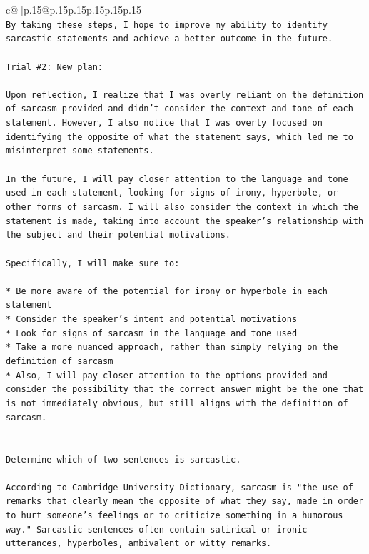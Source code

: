 \documentclass{article}
\begin{document}
{\begin{supertabular}{c@{$\;$}|p{.15\linewidth}@{}p{.15\linewidth}p{.15\linewidth}p{.15\linewidth}p{.15\linewidth}p{.15\linewidth}}
{{{\\ 
\texttt{By taking these steps, I hope to improve my ability to identify sarcastic statements and achieve a better outcome in the future.} \\
\\ 
\texttt{Trial \#2: New plan: } \\
\\ 
\texttt{Upon reflection, I realize that I was overly reliant on the definition of sarcasm provided and didn't consider the context and tone of each statement. However, I also notice that I was overly focused on identifying the opposite of what the statement says, which led me to misinterpret some statements. } \\
\\ 
\texttt{In the future, I will pay closer attention to the language and tone used in each statement, looking for signs of irony, hyperbole, or other forms of sarcasm. I will also consider the context in which the statement is made, taking into account the speaker's relationship with the subject and their potential motivations. } \\
\\ 
\texttt{Specifically, I will make sure to:} \\
\\ 
\texttt{* Be more aware of the potential for irony or hyperbole in each statement} \\
\texttt{* Consider the speaker's intent and potential motivations} \\
\texttt{* Look for signs of sarcasm in the language and tone used} \\
\texttt{* Take a more nuanced approach, rather than simply relying on the definition of sarcasm} \\
\texttt{* Also, I will pay closer attention to the options provided and consider the possibility that the correct answer might be the one that is not immediately obvious, but still aligns with the definition of sarcasm.} \\
\\ 
\\ 
\texttt{Determine which of two sentences is sarcastic.} \\
\\ 
\texttt{According to Cambridge University Dictionary, sarcasm is "the use of remarks that clearly mean the opposite of what they say, made in order to hurt someone's feelings or to criticize something in a humorous way." Sarcastic sentences often contain satirical or ironic utterances, hyperboles, ambivalent or witty remarks.} \\
}}}
\end{supertabular}}
\end{document}
